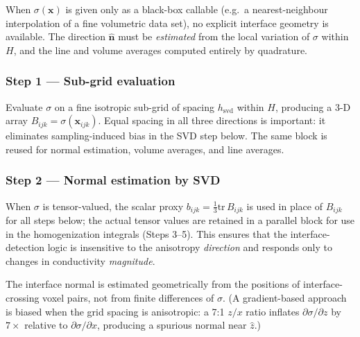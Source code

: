 \documentclass[11pt]{article}
\newcommand{\nn}{\hat{\bm{n}}}
\begin{document}
When $\sigma(\bm{x})$ is given only as a black-box callable (e.g.\ a
nearest-neighbour interpolation of a fine volumetric data set), no explicit
interface geometry is available.  The direction $\nn$ must be \emph{estimated}
from the local variation of $\sigma$ within $H$, and the line and volume
averages computed entirely by quadrature.

\subsubsection*{Step 1 — Sub-grid evaluation}

Evaluate $\sigma$ on a fine isotropic sub-grid of spacing $h_\mathrm{svd}$
within $H$, producing a 3-D array $B_{ijk} = \sigma(\bm{x}_{ijk})$.  Equal
spacing in all three directions is important: it eliminates sampling-induced
bias in the SVD step below.  The same block is reused for normal estimation,
volume averages, and line averages.

\subsubsection*{Step 2 — Normal estimation by SVD}

When $\sigma$ is tensor-valued, the scalar proxy $b_{ijk} = \tfrac{1}{3}\mathrm{tr}\,B_{ijk}$
is used in place of $B_{ijk}$ for all steps below; the actual tensor values are
retained in a parallel block for use in the homogenization integrals (Steps 3--5).
This ensures that the interface-detection logic is insensitive to the anisotropy
\emph{direction} and responds only to changes in conductivity \emph{magnitude}.

The interface normal is estimated geometrically from the positions of
interface-crossing voxel pairs, not from finite differences of $\sigma$.
(A gradient-based approach is biased when the grid spacing is anisotropic:
a 7:1 $z/x$ ratio inflates $\partial\sigma/\partial z$ by $7\times$ relative
to $\partial\sigma/\partial x$, producing a spurious normal near $\hat{z}$.)
\end{document}
